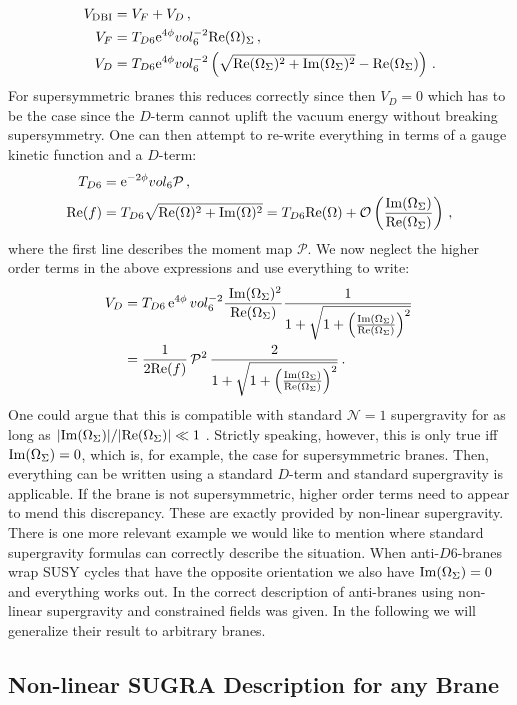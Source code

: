 \documentclass[a4paper,12pt]{report}
\newcommand{\bea}{\begin{equation}\begin{aligned}}
\newcommand{\eea}{\end{aligned}\end{equation}}
\def\rme{{\rm e}}
\def\rmre{{\rm Re}}
\def\rmim{{\rm Im}}
\begin{document}
\bea
V_{\text{DBI}} &= V_F + V_D\,,\\
V_F &= T_{D6} \rme^{4 \phi} vol_6^{-2} \rmre (\Omega)_\Sigma\,,\\
V_D &= T_{D6} \rme^{4 \phi} vol_6^{-2} \left( \sqrt{\rmre(\Omega_\Sigma)^2 + \rmim(\Omega_\Sigma)^2} - \rmre (\Omega_\Sigma)\right)\,.
\eea
For supersymmetric branes this reduces correctly since then $V_D = 0$ which has to be the case since the $D$-term cannot uplift the vacuum energy without breaking supersymmetry. One can then attempt to re-write everything in terms of a gauge kinetic function and a $D$-term:
\bea 
T_{D6} &= \rme^{-2\phi}vol_6 \mathcal{P}\,,\\
\rmre(f) &= T_{D6} \sqrt{\rmre(\Omega)^2+\rmim(\Omega)^2} = T_{D6} \rmre(\Omega) + \mathcal{O} \left(\frac{\rmim(\Omega_\Sigma)}{\rmre(\Omega_\Sigma)}\right)\,,
\eea
where the first line describes the moment map $\mathcal{P}$. We now neglect the higher order terms in the above expressions and use everything to write:
\bea 
V_D &= T_{D6} \, \rme^{4 \phi} \, vol_6^{-2} \frac{\;\rmim(\Omega_\Sigma)^2}{\rmre(\Omega_\Sigma)} \frac{1}{1+\sqrt{1+\left(\frac{\rmim(\Omega_\Sigma)}{\rmre(\Omega_\Sigma)}\right)^2}}\,\\
&= \frac{1}{2\rmre(f)} \, \mathcal{P}^2 \, \frac{2}{1+\sqrt{1+\left(\frac{\rmim(\Omega_\Sigma)}{\rmre(\Omega_\Sigma)}\right)^2}}\,.
\eea
One could argue that this is compatible with standard $\mathcal{N}=1$ supergravity for as long as $|\rmim(\Omega_\Sigma)|/|\rmre(\Omega_\Sigma)| \ll 1$ \cite{Villadoro:2006ia}. Strictly speaking, however, this is only true iff $\rmim(\Omega_\Sigma) = 0$, which is, for example, the case for supersymmetric branes. Then, everything can be written using a standard $D$-term and standard supergravity is applicable. If the brane is not supersymmetric, higher order terms need to appear to mend this discrepancy. These are exactly provided by non-linear supergravity. There is one more relevant example we would like to mention where standard supergravity formulas can correctly describe the situation. When anti-$D6$-branes wrap SUSY cycles that have the opposite orientation we also have $\rmim(\Omega_\Sigma)=0$ and everything works out. In \cite{Kallosh:2018nrk} the correct description of anti-branes using non-linear supergravity and constrained fields was given. In the following we will generalize their result to arbitrary branes.

\subsection{Non-linear SUGRA Description for any Brane}
\end{document}

